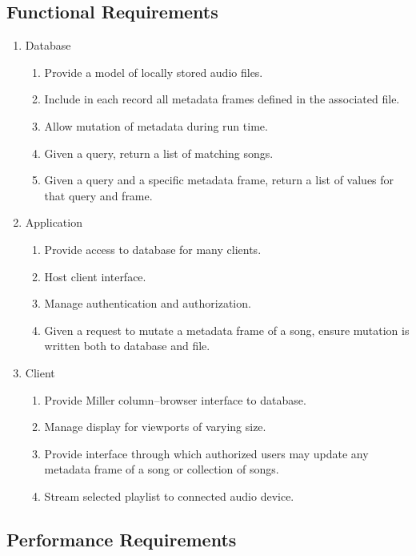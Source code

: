 \documentclass{abrice}
\begin{document}
\subsection{Functional Requirements}

\begin{enumerate}
\item Database
  \begin{enumerate}
  \item Provide a model of locally stored audio files.
  \item Include in each record all metadata frames defined in the associated
    file.
  \item Allow mutation of metadata during run time.
  \item Given a query, return a list of matching songs.
  \item Given a query and a specific metadata frame, return a list of values for
    that query and frame.
  \end{enumerate}

\item Application
  \begin{enumerate}
  \item Provide access to database for many clients.
  \item Host client interface.
  \item Manage authentication and authorization.
  \item Given a request to mutate a metadata frame of a song, ensure mutation is written
    both to database and file.
  \end{enumerate}

\item Client
  \begin{enumerate}
  \item Provide Miller column--browser interface to database.
  \item Manage display for viewports of varying size.
  \item Provide interface through which authorized users may update any metadata
    frame of a song or collection of songs.
  \item Stream selected playlist to connected audio device.
  \end{enumerate}
\end{enumerate}

\subsection{Performance Requirements}
\end{document}
